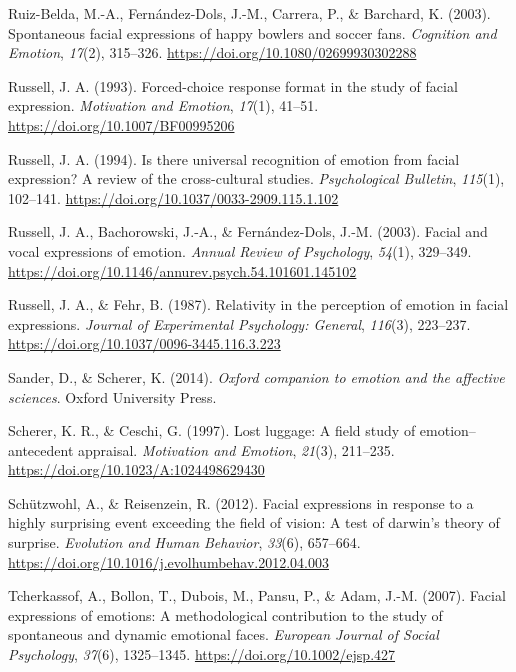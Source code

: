 \documentclass[
  english,
  man]{apa7}
\newlength{\cslhangindent}
\newenvironment{cslreferences}%
  {\setlength{\parindent}{0pt}%
  \everypar{\setlength{\hangindent}{\cslhangindent}}\ignorespaces}%
  {\par}
\begin{document}
\begin{cslreferences}
\leavevmode\hypertarget{ref-ruiz2003spontaneous}{}%
Ruiz-Belda, M.-A., Fernández-Dols, J.-M., Carrera, P., \& Barchard, K. (2003). Spontaneous facial expressions of happy bowlers and soccer fans. \emph{Cognition and Emotion}, \emph{17}(2), 315--326. \url{https://doi.org/10.1080/02699930302288}

\leavevmode\hypertarget{ref-russell1993forced}{}%
Russell, J. A. (1993). Forced-choice response format in the study of facial expression. \emph{Motivation and Emotion}, \emph{17}(1), 41--51. \url{https://doi.org/10.1007/BF00995206}

\leavevmode\hypertarget{ref-russell1994there}{}%
Russell, J. A. (1994). Is there universal recognition of emotion from facial expression? A review of the cross-cultural studies. \emph{Psychological Bulletin}, \emph{115}(1), 102--141. \url{https://doi.org/10.1037/0033-2909.115.1.102}

\leavevmode\hypertarget{ref-russell2003facial}{}%
Russell, J. A., Bachorowski, J.-A., \& Fernández-Dols, J.-M. (2003). Facial and vocal expressions of emotion. \emph{Annual Review of Psychology}, \emph{54}(1), 329--349. \url{https://doi.org/10.1146/annurev.psych.54.101601.145102}

\leavevmode\hypertarget{ref-russell1987relativity}{}%
Russell, J. A., \& Fehr, B. (1987). Relativity in the perception of emotion in facial expressions. \emph{Journal of Experimental Psychology: General}, \emph{116}(3), 223--237. \url{https://doi.org/10.1037/0096-3445.116.3.223}

\leavevmode\hypertarget{ref-sander2014oxford}{}%
Sander, D., \& Scherer, K. (2014). \emph{Oxford companion to emotion and the affective sciences}. Oxford University Press.

\leavevmode\hypertarget{ref-scherer1997lost}{}%
Scherer, K. R., \& Ceschi, G. (1997). Lost luggage: A field study of emotion--antecedent appraisal. \emph{Motivation and Emotion}, \emph{21}(3), 211--235. \url{https://doi.org/10.1023/A:1024498629430}

\leavevmode\hypertarget{ref-schutzwohl2012facial}{}%
Schützwohl, A., \& Reisenzein, R. (2012). Facial expressions in response to a highly surprising event exceeding the field of vision: A test of darwin's theory of surprise. \emph{Evolution and Human Behavior}, \emph{33}(6), 657--664. \url{https://doi.org/10.1016/j.evolhumbehav.2012.04.003}

\leavevmode\hypertarget{ref-tcherkassof2007facial}{}%
Tcherkassof, A., Bollon, T., Dubois, M., Pansu, P., \& Adam, J.-M. (2007). Facial expressions of emotions: A methodological contribution to the study of spontaneous and dynamic emotional faces. \emph{European Journal of Social Psychology}, \emph{37}(6), 1325--1345. \url{https://doi.org/10.1002/ejsp.427}


\end{cslreferences}
\end{document}

